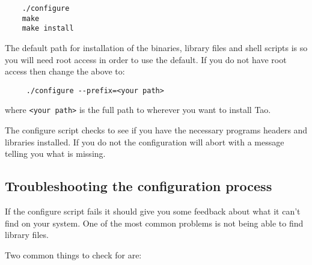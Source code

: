 \begin{verbatim}
    ./configure
    make
    make install
\end{verbatim}

The default path for installation of the binaries, library files and
shell scripts is  so you will need root access in order
to use the default. If you do not have root access then change the
above to:

\begin{verbatim}
     ./configure --prefix=<your path>
\end{verbatim}

where \verb|<your path>| is the full path to wherever you want to
install Tao.

The configure script checks to see if you have the necessary programs
headers and libraries installed. If you do not the configuration will
abort with a message telling you what is missing. 

\subsection{Troubleshooting the configuration process}
If the configure script fails it should give you some feedback about
what it can't find on your system. One of the most common problems
is not being able to find library files.

Two common things to check for are: 


